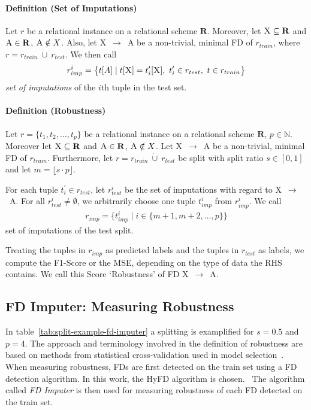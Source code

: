 \paragraph{Definition (Set of Imputations)}
Let \( r \) be a relational instance on a relational scheme \( \mathbf{R} \).
Moreover, let \( \textsc{X} \subseteq \mathbf{R} \) and \( \textsc{A} \in \mathbf{R} \), \( \textsc{A} \notin X\).
Also, let \textsc{X}~\( \rightarrow \)~\textsc{A} be a non-trivial, minimal FD of \( r_{train} \), where \( r = r_{train}~\dot\cup~r_{test} \).
We then call
\begin{align}
    r_{imp}^{i} = \big\{ t[A] \mid t[\textsc{X}] = t^{\prime}_{i}[\textsc{X}],~t^{\prime}_{i} \in r_{test},~t \in r_{train} \big\}
\end{align}
\emph{set of imputations} of the \( i \)th tuple in the test set.

\paragraph{Definition (Robustness)}
Let \( r = \{ t_1, t_2, \dots, t_p \}\) be a relational instance on a relational scheme \( \mathbf{R} \), \( p \in \mathbb{N} \).
Moreover let \( \textsc{X} \subseteq \mathbf{R} \) and \( \textsc{A} \in \mathbf{R} \), \( \textsc{A} \notin X\).
Let \textsc{X}~\( \rightarrow \)~\textsc{A} be a non-trivial, minimal FD of \( r_{train} \).
Furthermore, let \( r = r_{train}~\dot\cup~r_{test} \) be split with split ratio \( s \in [0, 1] \) and let \( m = \lfloor s \cdot p \rfloor \).

For each tuple \( t^{\prime}_i \in r_{test} \), let \( r^{i}_{test} \) be the set of imputations with regard to \textsc{X}~\( \rightarrow \)~\textsc{A}.
For all \( r^{i}_{test} \neq \emptyset \), we arbitrarily choose one tuple \( t_{imp}^{i} \) from \( r_{imp}^i \).
We call
\begin{align}\label{eq:imputation-set}
    r_{imp} = \big\{ t_{imp}^{i} \mid i \in \{ m + 1, m + 2, \dots, p \} \big\}
\end{align}
set of imputations of the test split.

Treating the tuples in \( r_{imp} \) as predicted labels and the tuples in \( r_{test} \) as labels, we compute the F1-Score or the MSE, depending on the type of data the RHS contains.
We call this Score `Robustness' of FD \textsc{X}~\( \rightarrow \)~\textsc{A}.


\subsection{FD Imputer: Measuring Robustness}
In table~\ref{tab:split-example-fd-imputer} a splitting is examplified for \( s = 0.5 \) and \( p=4 \).
The approach and terminology involved in the definition of robustness are based on methods from statistical cross-validation used in model selection~\cite[p.~172]{HAY08}.
When measuring robustness, FDs are first detected on the train set using a FD detection algorithm.
In this work, the HyFD algorithm is chosen.~\cite{PAP16}
The algorithm called \emph{FD Imputer} is then used for measuring robustness of each FD detected on the train set.

